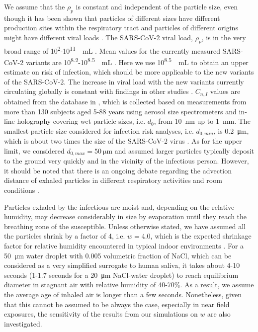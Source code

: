 \documentclass[preprint]{elsarticle}
\begin{document}
We assume that the $\rho_{p}$ is constant and independent of the particle size, even though it has been shown that particles of different sizes have different production sites within the respiratory tract \cite{Pohlker2021} and particles of different origins might have different viral loads \cite{hou2020sars}. The SARS-CoV-2 viral load, $\rho_p$, is in the very broad range of 10\textsuperscript{2}-10\textsuperscript{11}\SI{}{\per\milli\liter} \cite{Miller2021}. Mean values for the currently measured SARS-CoV-2 variants are 10\textsuperscript{8.2}-10\textsuperscript{8.5}\SI{}{\per\milli\liter} \cite{kissler2021densely}. Here we use 10\textsuperscript{8.5}\SI{}{\per\milli\liter} to obtain an upper estimate on risk of infection, which should be more applicable to the new variants of the SARS-CoV-2. The increase in viral load with the new variants currently circulating globally is constant with findings in other studies \cite[e.g. see][and references therein]{Jones2021}.  $C_{n,I}$ values are obtained from the database in \cite{heads}, which is collected based on measurements from more than 130 subjects aged 5-88 years using aerosol size spectrometers and in-line holography covering wet particle sizes, i.e. $d_0$, from \SI{10}{\nano\meter} up to \SI{1}{\milli\meter}. The smallest particle size considered for infection risk analyses, i.e. $d_{0, min}$, is \SI{0.2}{\micro\meter}, which is about two times the size of the SARS-CoV-2 virus \cite[e.g. see][]{Pohlker2021, Nordsiek2021}. As for the upper limit, we considered $d_{0, max} = \SI{50}{\micro\meter}$ and assumed larger particles typically deposit to the ground very quickly and in the vicinity of the infectious person. However, it should be noted that there is an ongoing debate regarding the advection distance of exhaled particles in different respiratory activities and room conditions \cite[e.g. see][and references therein for more details]{Chong_2021, Wang2021}.

Particles exhaled by the infectious are moist and, depending on the relative humidity, may decrease considerably in size by evaporation until they reach the breathing zone of the susceptible. Unless otherwise stated, we have assumed all the particles shrink by a factor of 4, i.e. $w = 4.0$, which is the expected shrinkage factor for relative humidity encountered in typical indoor environments \cite{Pohlker2021}. For a \SI{50}{\micro\meter} water droplet with 0.005 volumetric fraction of NaCl, which can be considered as a very simplified surrogate to human saliva, it takes about 4-10 seconds (1-1.7 seconds for a \SI{20}{\micro\meter} NaCl-water droplet) to reach equilibrium diameter in stagnant air with relative humidity of 40-70\%. As a result, we assume the average age of inhaled air is longer than a few seconds. Nonetheless, given that this cannot be assumed to be always the case, especially in near field exposures, the sensitivity of the results from our simulations on $w$ are also investigated. 
\end{document}
